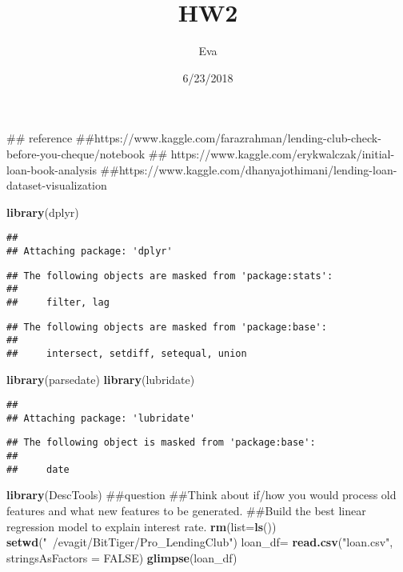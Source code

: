 \documentclass[]{article}
\title{HW2}
\author{Eva}
\date{6/23/2018}
\newenvironment{Shaded}{\begin{snugshade}}{\end{snugshade}}
\newcommand{\KeywordTok}[1]{\textcolor[rgb]{0.13,0.29,0.53}{\textbf{#1}}}
\newcommand{\DataTypeTok}[1]{\textcolor[rgb]{0.13,0.29,0.53}{#1}}
\newcommand{\StringTok}[1]{\textcolor[rgb]{0.31,0.60,0.02}{#1}}
\newcommand{\OtherTok}[1]{\textcolor[rgb]{0.56,0.35,0.01}{#1}}
\newcommand{\NormalTok}[1]{#1}
\begin{document}
\maketitle

\begin{Shaded}
\begin{Highlighting}[]
\NormalTok{## reference }
\NormalTok{##https://www.kaggle.com/farazrahman/lending-club-check-before-you-cheque/notebook}
\NormalTok{## https://www.kaggle.com/erykwalczak/initial-loan-book-analysis}
\NormalTok{##https://www.kaggle.com/dhanyajothimani/lending-loan-dataset-visualization}

\KeywordTok{library}\NormalTok{(dplyr)}
\end{Highlighting}
\end{Shaded}

\begin{verbatim}
## 
## Attaching package: 'dplyr'
\end{verbatim}

\begin{verbatim}
## The following objects are masked from 'package:stats':
## 
##     filter, lag
\end{verbatim}

\begin{verbatim}
## The following objects are masked from 'package:base':
## 
##     intersect, setdiff, setequal, union
\end{verbatim}

\begin{Shaded}
\begin{Highlighting}[]
\KeywordTok{library}\NormalTok{(parsedate)}
\KeywordTok{library}\NormalTok{(lubridate)}
\end{Highlighting}
\end{Shaded}

\begin{verbatim}
## 
## Attaching package: 'lubridate'
\end{verbatim}

\begin{verbatim}
## The following object is masked from 'package:base':
## 
##     date
\end{verbatim}

\begin{Shaded}
\begin{Highlighting}[]
\KeywordTok{library}\NormalTok{(DescTools)}
\NormalTok{##question}
\NormalTok{##Think about if/how you would process old features and what new features to be generated.}
\NormalTok{##Build the best linear regression model to explain interest rate.}
\KeywordTok{rm}\NormalTok{(}\DataTypeTok{list=}\KeywordTok{ls}\NormalTok{())}
\KeywordTok{setwd}\NormalTok{(}\StringTok{"~/evagit/BitTiger/Pro_LendingClub"}\NormalTok{)}
\NormalTok{loan_df=}\StringTok{ }\KeywordTok{read.csv}\NormalTok{(}\StringTok{"loan.csv"}\NormalTok{, }\DataTypeTok{stringsAsFactors =} \OtherTok{FALSE}\NormalTok{)}
\KeywordTok{glimpse}\NormalTok{(loan_df)}
\end{Highlighting}
\end{Shaded}
\end{document}
